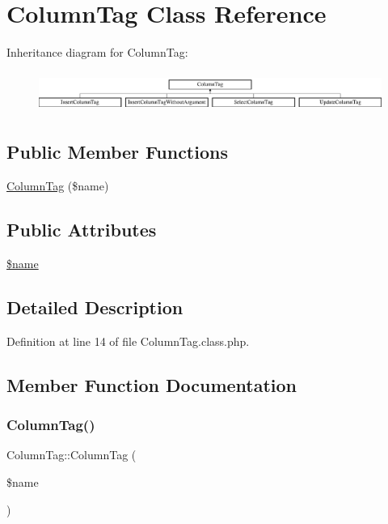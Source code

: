 \hypertarget{classColumnTag}{}\section{Column\+Tag Class Reference}
\label{classColumnTag}
Inheritance diagram for Column\+Tag\+:\begin{figure}[H]
\begin{center}
\leavevmode
\includegraphics[height=1.339713cm]{classColumnTag}
\end{center}
\end{figure}
\subsection*{Public Member Functions}
\begin{DoxyCompactItemize}
\item 
\hyperlink{classColumnTag_a0bea3e9971339117978a91ae0e468474}{Column\+Tag} (\$name)
\end{DoxyCompactItemize}
\subsection*{Public Attributes}
\begin{DoxyCompactItemize}
\item 
\hyperlink{classColumnTag_a46a615aa1822a191d42274fc5d6d79b1}{\$name}
\end{DoxyCompactItemize}


\subsection{Detailed Description}


Definition at line 14 of file Column\+Tag.\+class.\+php.



\subsection{Member Function Documentation}
\hypertarget{classColumnTag_a0bea3e9971339117978a91ae0e468474}{}\label{classColumnTag_a0bea3e9971339117978a91ae0e468474} 
\subsubsection{\texorpdfstring{Column\+Tag()}{ColumnTag()}}
{\footnotesize\ttfamily Column\+Tag\+::\+Column\+Tag (\begin{DoxyParamCaption}\item[{}]{\$name }\end{DoxyParamCaption})}

